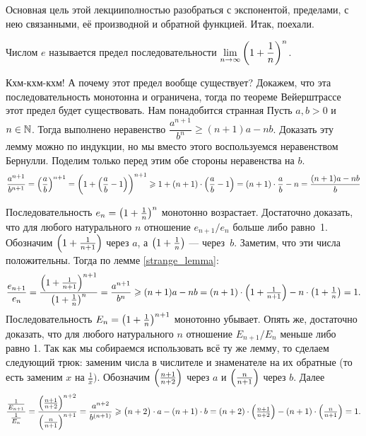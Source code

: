 \documentclass[a4paper,12pt]{article}
\begin{document}
\vspace*{-1.2cm}

Основная цель этой лекции\т полностью разобраться с экспонентой, пределами, с нею связанными, её производной и обратной функцией.
Итак, поехали.


Числом $e$ называется предел последовательности $\lim\limits_{n \rightarrow \infty}\left(1+\dfrac1n\right)^n$.

Кхм-кхм-кхм!
А почему этот предел вообще существует?
Докажем, что эта последовательность монотонна и ограничена, тогда по теореме Вейерштрассе этот предел будет существовать.
Нам понадобится странная
\label{strange_lemma}
Пусть $a,b>0$ и~$n\in\mathbb{N}$. Тогда выполнено неравенство $\dfrac{a^{n+1}}{b^n}\geqslant(n+1)a-nb$.
Доказать эту лемму можно по индукции,
но мы вместо этого воспользуемся неравенством Бернулли.
Поделим только перед этим обе стороны неравенства на $b$.
$$
\frac{a^{n+1}}{b^{n+1}} = \hr{\frac{a}{b}}^{n+1}=\bbr{1+\Br{\frac{a}{b}-1}}^{n+1}\ge1 + (n+1)\cdot\Br{\frac{a}{b}-1} = (n+1)\cdot\frac{a}{b} - n = \frac{(n+1)a-nb}{b}
\vspace{-4mm}
$$


\label{monoton1}
Последовательность $e_n = \left(1+\frac{1}n\right)^n$ монотонно возрастает.
Достаточно доказать, что для любого натурального $n$ отношение $e_{n+1}/e_n$ больше либо равно~1.
Обозначим $\left(1+\frac{1}{n+1}\right)$ через $a$, а $\left(1+\frac{1}n\right)$ --- через~$b$.
Заметим, что эти числа положительны.
Тогда по лемме \ref{strange_lemma}:
$$
\frac{e_{n+1}}{e_n}
=
\frac{\hr{1+\frac{1}{n+1}}^{n+1}}{\hr{1+\frac{1}n}^n}
=
\frac{a^{n+1}}{b^n}\geqslant(n+1)a-nb
=
(n+1)\cdot\hr{1+\tfrac{1}{n+1}} - n\cdot\hr{1+\tfrac{1}n}
=
1.
\vspace{-4mm}
$$
\label{monoton2}
Последовательность $E_n = \left(1+\frac{1}n\right)^{n+1}$ монотонно убывает.
Опять же, достаточно доказать, что для любого натурального $n$ отношение $E_{n+1}/E_n$ меньше либо равно 1.
Так как мы собираемся использовать всё ту же лемму, то сделаем следующий трюк: заменим числа в числителе и знаменателе на их обратные (то есть заменим $x$ на $\frac1x)$.
Обозначим $\left(\frac{n+1}{n+2}\right)$ через $a$ и $\left(\frac{n}{n+1}\right)$ через $b$.
Далее
$$
\dfrac{\frac{1}{E_{n+1}}}{\frac{1}{E_n}}
=
\frac{\hr{\frac{n+1}{n+2}}^{n+2}}{\hr{\frac{n}{n+1}}^{n+1}}
=
\frac{a^{n+2}}{b^{(n+1)}}
\ge
\br{n+2}\cdot a - (n+1)\cdot b
=
(n+2)\cdot \hr{\tfrac{n+1}{n+2}} - (n+1)\cdot \hr{\tfrac{n}{n+1}}
=
1.
\vspace{-4mm}
$$
\end{document}
